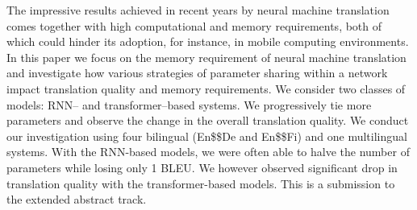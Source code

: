 The impressive results achieved in recent years by neural machine translation comes together with high computational and memory requirements, both of which could hinder its adoption, for instance, in mobile computing environments. In this paper we focus on the memory requirement of neural machine translation and investigate how various strategies of parameter sharing within a network impact translation quality and memory requirements. We consider two classes of models: RNN-- and transformer--based systems. We progressively tie more parameters and observe the change in the overall translation quality. We conduct our investigation using four bilingual (En\$\leftrightarrow\$De and En\$\leftrightarrow\$Fi) and one multilingual systems. With the RNN-based models, we were often able to halve the number of parameters while losing only 1 BLEU. We however observed significant drop in translation quality with the transformer-based models. This is a submission to the extended abstract track.
